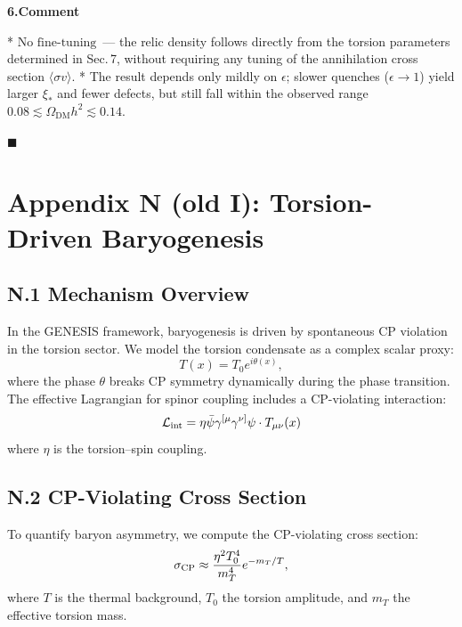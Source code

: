 \documentclass{article}
\begin{document}
\vspace{0.6em}
\noindent\textbf{6.\;Comment}

*   \(\boxed{\text{No fine‑tuning}}\) — the relic density follows directly from
    the torsion parameters determined in Sec.\,7, without requiring any tuning
    of the annihilation cross section \(\langle\sigma v\rangle\).
*   The result depends only mildly on \(\epsilon\); slower quenches
    (\(\epsilon\!\rightarrow\!1\)) yield larger \(\xi_*\) and fewer
    defects, but still fall within the observed range
    \(0.08\lesssim\Omega_{\text{DM}}h^{2}\lesssim0.14\).

\hfill\(\blacksquare\)






\section*{Appendix N (old I): Torsion-Driven Baryogenesis}
\label{app:baryogenesis}

\subsection*{N.1 Mechanism Overview}
In the GENESIS framework, baryogenesis is driven by spontaneous CP violation in the torsion sector. We model the torsion condensate as a complex scalar proxy:
\begin{equation}
T(x) = T_0 e^{i\theta(x)},
\end{equation}
where the phase $\theta$ breaks CP symmetry dynamically during the phase transition. The effective Lagrangian for spinor coupling includes a CP-violating interaction:
\begin{equation}
\mathcal{L}_{\rm int} = \eta \bar{\psi} \gamma^{[\mu} \gamma^{\nu]} \psi \cdot T_{\mu\nu}(x)
\end{equation}
where $\eta$ is the torsion–spin coupling.

\subsection*{N.2 CP-Violating Cross Section}
To quantify baryon asymmetry, we compute the CP-violating cross section:
\begin{equation}
\sigma_{\rm CP} \approx \frac{\eta^2 T_0^4}{m_T^4} e^{-m_T/T},
\end{equation}
where $T$ is the thermal background, $T_0$ the torsion amplitude, and $m_T$ the effective torsion mass.
\end{document}
